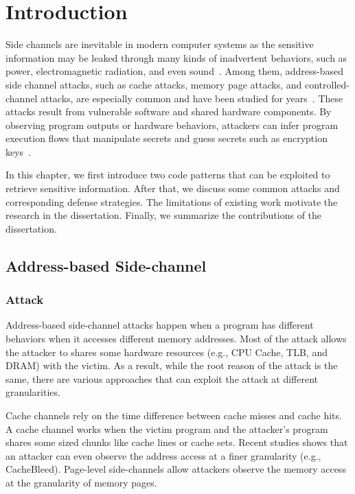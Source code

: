 
\chapter{Introduction} \label{chapter1}

Side channels are inevitable in modern computer systems as the sensitive
information may be leaked through many kinds of inadvertent behaviors, such as power, electromagnetic radiation, and even
sound~\cite{agrawal2002side,kar20178,chari1999towards,217605,genkin2014rsa}.
Among them, address-based side channel attacks, such as cache attacks, memory page attacks, and controlled-channel attacks, are especially common and have been studied for years~\cite{7163052,217543,217589,lee2017inferring,191010,liu2015last}. These
attacks result from vulnerable software and shared hardware components.
By observing program outputs or hardware behaviors, attackers can infer program
execution flows that manipulate secrets and guess secrets such as encryption
keys~\cite{Osvik2006,Gullasch:2011:CGB:2006077.2006784,203878,10.1007/978-3-540-45238-6_6}.

In this chapter, we first introduce two code patterns that can be exploited to retrieve sensitive information. After that, we discuss some common attacks and corresponding defense strategies. The limitations of existing work motivate the research in the dissertation. Finally, we summarize the contributions of the dissertation.

\section{Address-based Side-channel}
\subsection{Attack}
Address-based side-channel attacks happen when a program has different behaviors when it accesses different memory addresses. Most of the attack allows the attacker to shares some hardware resources (e.g., CPU Cache, TLB, and DRAM) with the victim. As a result, while the root reason of the attack is the same, there are various approaches that can exploit the attack at different granularities. 

Cache channels rely on the time difference between cache misses and cache hits. A cache channel works when the victim program and the attacker's program shares some sized chunks like cache lines or cache sets. Recent studies shows that an attacker can even observe the address access at a finer granularity (e.g., CacheBleed). Page-level side-channels allow attackers observe the memory access at the granularity of memory pages. 

